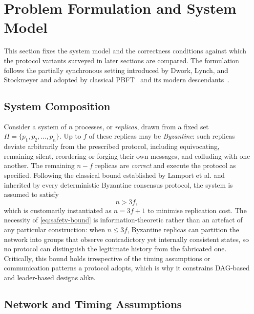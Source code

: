 \section{Problem Formulation and System Model}

This section fixes the system model and the correctness conditions against which the protocol variants surveyed in later sections are compared. The formulation follows the partially synchronous setting introduced by Dwork, Lynch, and Stockmeyer and adopted by classical PBFT~\cite{castro1999practical} and its modern descendants~\cite{buchman2016tendermint,yin2019hotstuff,buterin2020combining}.

\subsection{System Composition}

Consider a system of $n$ processes, or \emph{replicas}, drawn from a fixed set $\Pi = \{p_1, p_2, \ldots, p_n\}$. Up to $f$ of these replicas may be \emph{Byzantine}: such replicas deviate arbitrarily from the prescribed protocol, including equivocating, remaining silent, reordering or forging their own messages, and colluding with one another. The remaining $n - f$ replicas are \emph{correct} and execute the protocol as specified. Following the classical bound established by Lamport et al. and inherited by every deterministic Byzantine consensus protocol, the system is assumed to satisfy
\begin{equation}
  n > 3f,
  \label{eq:safety-bound}
\end{equation}
which is customarily instantiated as $n = 3f + 1$ to minimise replication cost. The necessity of \eqref{eq:safety-bound} is information-theoretic rather than an artefact of any particular construction: when $n \leq 3f$, Byzantine replicas can partition the network into groups that observe contradictory yet internally consistent states, so no protocol can distinguish the legitimate history from the fabricated one. Critically, this bound holds irrespective of the timing assumptions or communication patterns a protocol adopts, which is why it constrains DAG-based and leader-based designs alike.

\subsection{Network and Timing Assumptions}

